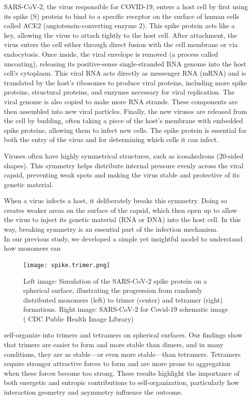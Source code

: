 \documentclass[12pt]{article}
\begin{document}
\begin{flushleft}
SARS-CoV-2, the virus responsible for COVID-19, enters a host cell by first using its spike (S) protein to bind to a specific receptor on the surface of human cells called ACE2 (angiotensin-converting enzyme 2). This spike protein acts like a key, allowing the virus to attach tightly to the host cell. After attachment, the virus enters the cell either through direct fusion with the cell membrane or via endocytosis. Once inside, the viral envelope is removed (a process called uncoating), releasing its positive-sense single-stranded RNA genome into the host cell’s cytoplasm. This viral RNA acts directly as messenger RNA (mRNA) and is translated by the host's ribosomes to produce viral proteins, including more spike proteins, structural proteins, and enzymes necessary for viral replication. The viral genome is also copied to make more RNA strands. These components are then assembled into new viral particles. Finally, the new viruses are released from the cell by budding, often taking a piece of the host’s membrane with embedded spike proteins, allowing them to infect new cells. The spike protein is essential for both the entry of the virus and for determining which cells it can infect.

Viruses often have highly symmetrical structures, such as icosahedrons (20-sided shapes). This symmetry helps distribute internal pressure evenly across the viral capsid, preventing weak spots and making the virus stable and protective of its genetic material.

When a virus infects a host, it deliberately breaks this symmetry. Doing so creates weaker areas on the surface of the capsid, which then open up to allow the virus to inject its genetic material (RNA or DNA) into the host cell. In this way, breaking symmetry is an essential part of the infection mechanism.\\


In our previous study, we developed a simple yet insightful model to understand how monomers can 
\begin{figure}[!ht]
  \centering
  \texttt{[image: spike.trimer.png]}
  \caption{Left image: Simulation of the SARS-CoV-2 spike protein on a spherical surface, illustrating the progression from randomly distributed monomers (left) to trimer (center) and tetramer (right) formations. Right image: SARS-CoV-2 for Covid-19 schematic image ( CDC Public
Health Image Library) \cite{cdc-covid}}
\end{figure}

\noindent self-organize into trimers and tetramers on spherical surfaces. Our findings show that trimers are easier to form and more stable than dimers, and in many conditions, they are as stable—or even more stable—than tetramers. Tetramers require stronger attractive forces to form and are more prone to aggregation when these forces become too strong. These results highlight the importance of both energetic and entropic contributions to self-organization, particularly how interaction geometry and asymmetry influence the outcome.






\end{flushleft}
\end{document}
